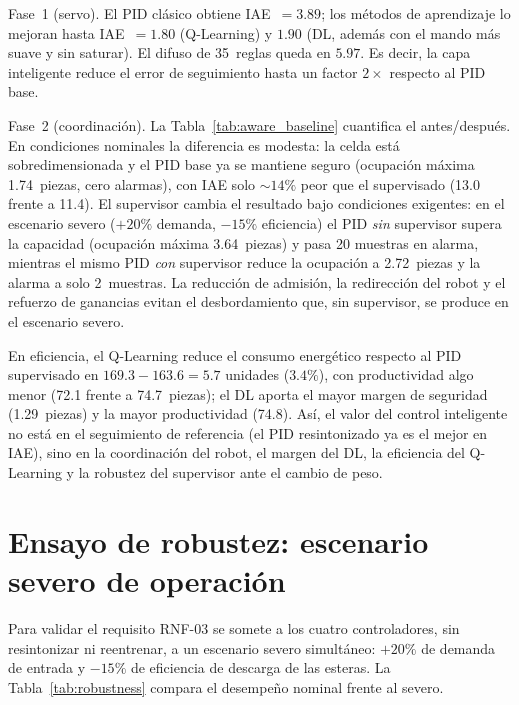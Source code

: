Fase~1 (servo). El PID clásico obtiene IAE~$=3.89$; los métodos de aprendizaje lo mejoran hasta IAE~$=1.80$ (Q-Learning) y $1.90$ (DL, además con el mando más suave y sin saturar). El difuso de 35~reglas queda en $5.97$. Es decir, la capa inteligente reduce el error de seguimiento hasta un factor $2\times$ respecto al PID base.

Fase~2 (coordinación). La Tabla~\ref{tab:aware_baseline} cuantifica el antes/después. En condiciones nominales la diferencia es modesta: la celda está sobredimensionada y el PID base ya se mantiene seguro (ocupación máxima 1.74~piezas, cero alarmas), con IAE solo $\sim14\%$ peor que el supervisado (13.0 frente a 11.4). El supervisor cambia el resultado bajo condiciones exigentes: en el escenario severo ($+20\%$ demanda, $-15\%$ eficiencia) el PID \emph{sin} supervisor supera la capacidad (ocupación máxima 3.64~piezas) y pasa 20 muestras en alarma, mientras el mismo PID \emph{con} supervisor reduce la ocupación a 2.72~piezas y la alarma a solo 2~muestras. La reducción de admisión, la redirección del robot y el refuerzo de ganancias evitan el desbordamiento que, sin supervisor, se produce en el escenario severo.



En eficiencia, el Q-Learning reduce el consumo energético respecto al PID supervisado en $169.3 - 163.6 = 5.7$ unidades ($3.4\%$), con productividad algo menor (72.1 frente a 74.7~piezas); el DL aporta el mayor margen de seguridad (1.29~piezas) y la mayor productividad (74.8). Así, el valor del control inteligente no está en el seguimiento de referencia (el PID resintonizado ya es el mejor en IAE), sino en la coordinación del robot, el margen del DL, la eficiencia del Q-Learning y la robustez del supervisor ante el cambio de peso.

\section{Ensayo de robustez: escenario severo de operación}
\label{sec:robustez_severa}

Para validar el requisito RNF-03 se somete a los cuatro controladores, sin resintonizar ni reentrenar, a un escenario severo simultáneo: $+20\%$ de demanda de entrada y $-15\%$ de eficiencia de descarga de las esteras. La Tabla~\ref{tab:robustness} compara el desempeño nominal frente al severo.



